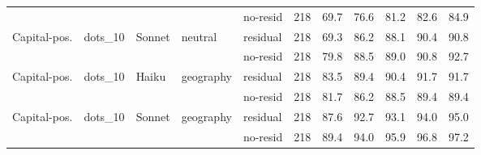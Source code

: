 \begin{table}[h]
\begin{tabular}{l l l l l r r r r r r}
  &     &     &     & no-resid    & 218 & 69.7 & 76.6 & 81.2 & 82.6 & 84.9 \\
\addlinespace[2pt]
Capital-pos. & dots\_10 & Sonnet & neutral & residual    & 218 & 69.3 & 86.2 & 88.1 & 90.4 & 90.8 \\
  &     &     &     & no-resid    & 218 & 79.8 & 88.5 & 89.0 & 90.8 & 92.7 \\
\addlinespace[2pt]
Capital-pos. & dots\_10 & Haiku & geography & residual    & 218 & 83.5 & 89.4 & 90.4 & 91.7 & 91.7 \\
  &     &     &     & no-resid    & 218 & 81.7 & 86.2 & 88.5 & 89.4 & 89.4 \\
\addlinespace[2pt]
Capital-pos. & dots\_10 & Sonnet & geography & residual    & 218 & 87.6 & 92.7 & 93.1 & 94.0 & 95.0 \\
  &     &     &     & no-resid    & 218 & 89.4 & 94.0 & 95.9 & 96.8 & 97.2 \\
\bottomrule
\end{tabular}
\end{table}
